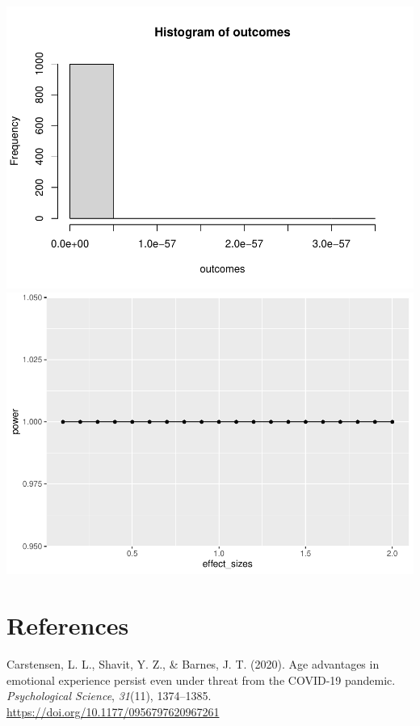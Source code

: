 \documentclass[
  english,
  man]{apa6}
\begin{document}
\includegraphics{APA_Rep_files/figure-latex/unnamed-chunk-2-1.pdf} \includegraphics{APA_Rep_files/figure-latex/unnamed-chunk-2-2.pdf}
\newpage

\hypertarget{references}{%
\section{References}\label{references}}

\begingroup
\setlength{\parindent}{-0.5in}
\setlength{\leftskip}{0.5in}

\hypertarget{refs}{}
\leavevmode\hypertarget{ref-carstensen_age_2020}{}%
Carstensen, L. L., Shavit, Y. Z., \& Barnes, J. T. (2020). Age advantages in emotional experience persist even under threat from the COVID-19 pandemic. \emph{Psychological Science}, \emph{31}(11), 1374--1385. \url{https://doi.org/10.1177/0956797620967261}

\endgroup
\end{document}
